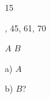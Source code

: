                                    15         
                                           
                                                               
                         
                                                                  
                           




, 45, 61, 70                                     
                                                                      
                                                                      
                                             
            




\prob %
                                                                $A$
    $B$          

\item{a)}                     $A$                             

\item{b)}                                                            
   $B$?

\bye

